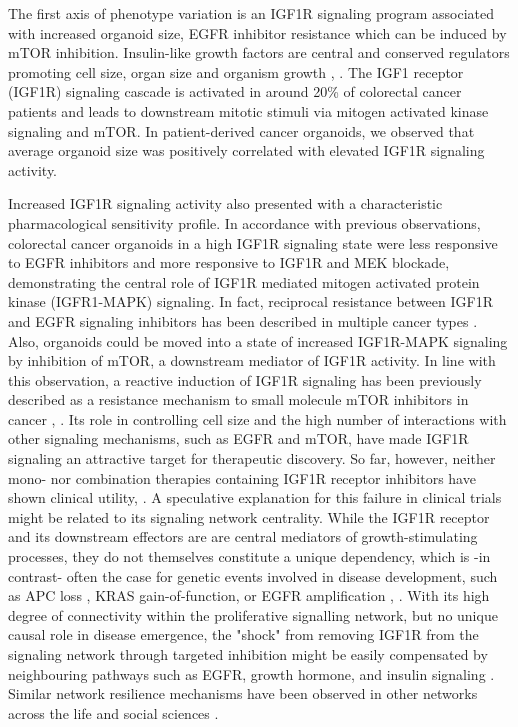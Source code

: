 \begin{flushleft}
The first axis of phenotype variation is an IGF1R signaling program associated with increased organoid size, EGFR inhibitor resistance which can be induced by mTOR inhibition. Insulin-like growth factors are central and conserved regulators promoting cell size, organ size and organism growth \cite{pucheHumanConditionsInsulinlike2012}, \cite{sunMechanismCellSize2006}. The IGF1 receptor (IGF1R) signaling cascade is activated in around 20\% of colorectal cancer patients and leads to downstream mitotic stimuli via mitogen activated kinase signaling and mTOR\cite{zhongOverproductionIGF2Drives2017}. In patient-derived cancer organoids, we observed that average organoid size was positively correlated with elevated IGF1R signaling activity.
\smallbreak

Increased IGF1R signaling activity also presented with a characteristic pharmacological sensitivity profile. In accordance with previous observations\cite{yaoCombinedIGF1RMEK2016}, colorectal cancer organoids in a high IGF1R signaling state were less responsive to EGFR inhibitors and more responsive to IGF1R and MEK blockade, demonstrating the central role of IGF1R mediated mitogen activated protein kinase (IGFR1-MAPK) signaling. In fact, reciprocal resistance between IGF1R and EGFR signaling inhibitors has been described in multiple cancer types \cite{huaInsulinlikeGrowthFactor2020a}. Also, organoids could be moved into a state of increased IGF1R-MAPK signaling by inhibition of mTOR, a downstream mediator of IGF1R activity. In line with this observation, a reactive induction of IGF1R signaling has been previously described as a resistance mechanism to small molecule mTOR inhibitors in cancer \cite{sharmaChromatinmediatedReversibleDrugtolerant2010a}, \cite{yoonFocalAdhesionIGF1RDependent2017a}. Its role in controlling cell size and the high number of interactions with other signaling mechanisms, such as EGFR and mTOR, have made IGF1R signaling an attractive target for therapeutic discovery. So far, however, neither mono- nor combination therapies containing IGF1R receptor inhibitors have shown clinical utility\cite{beckwithMinireviewWereIGF2015}, \cite{CostsCausesOncologya}. A speculative explanation for this failure in clinical trials might be related to its signaling network centrality. While the IGF1R receptor and its downstream effectors are are central mediators of growth-stimulating processes, they do not themselves constitute a unique dependency, which is -in contrast- often the case for genetic events involved in disease development, such as APC loss \cite{Dow2015-pc}, KRAS gain-of-function, or EGFR amplification \cite{katoRevisitingEpidermalGrowth2019}, \cite{randonEGFRAmplificationMetastatic2021}. With its high degree of connectivity within the proliferative signalling network, but no unique causal role in disease emergence, the "shock" from removing IGF1R from the signaling network through targeted inhibition might be easily compensated by neighbouring pathways such as EGFR, growth hormone, and insulin signaling \cite{beckwithMinireviewWereIGF2015}. Similar network resilience mechanisms have been observed in other networks across the life and social sciences \cite{liuNetworkResilience2022a}.
\smallbreak


\end{flushleft}
